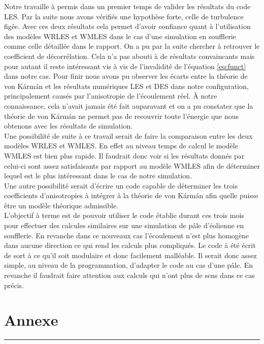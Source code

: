 \documentclass[12pt]{article}   %
\theoremstyle{plain}
\theoremstyle{remark}
\begin{document}
Notre travaille à permis dans un premier temps de valider les résultats du code LES. Par la suite nous avons vérifiés une hypothèse forte, celle de turbulence figée. Avec ces deux résultats cela permet d'avoir confiance quant à l'utilisation des modèles WRLES et WMLES dans le cas d'une simulation en soufflerie comme celle détaillée dans le rapport. On a pu par la suite chercher à retrouver le coefficient de décorrélation. Cela n'a pas abouti à de résultats convaincants mais pour autant il reste intéressant vis à vis de l'invalidité de l'équation \ref{eq:funct} dans notre cas. Pour finir nous avons pu observer les écarts entre la théorie de von Kármán et les résultats numériques LES et DES dans notre configuration, principalement causés par l'anisotropie de l'écoulement réel. À notre connaissance, cela n'avait jamais été fait auparavant et on a pu constater que la théorie de von Kármán ne permet pas de recouvrir toute l'énergie que nous obtenons avec les résultats de simulation. \\ 
Une possibilité de suite à ce travail serait de faire la comparaison entre les deux modèles WRLES et WMLES. En effet au niveau temps de calcul le modèle WMLES est bien plus rapide. Il faudrait donc voir si les résultats donnés par celui-ci sont assez satisfaisants par rapport au modèle WMLES afin de déterminer lequel est le plus intéressant dans le cas de notre simulation. \\
Une autre possibilité serait d'écrire un code capable de déterminer les trois coefficients d'anisotropies à intégrer à la théorie de von Kármán afin quelle puisse être un modèle théorique admissible.\\
L'objectif à terme est de pouvoir utiliser le code établie durant ces trois mois pour effectuer des calcules similaires sur une simulation de pâle d'éolienne en soufflerie. En revanche dans ce nouveaux cas l'écoulement n'est plus homogène dans aucune direction ce qui rend les calculs plus compliqués. Le code à été écrit de sort à ce qu'il soit modulaire et donc facilement malléable. Il serait donc assez simple, au niveau de la programmation, d'adapter le code au cas d'une pâle. En revanche il faudrait faire attention aux calculs qui n'ont plus de sens dans ce cas précis.
				
\pagebreak

\section{Annexe}
\noindent\rule{\linewidth}{2pt}
\vspace{0.1cm}
\end{document}
